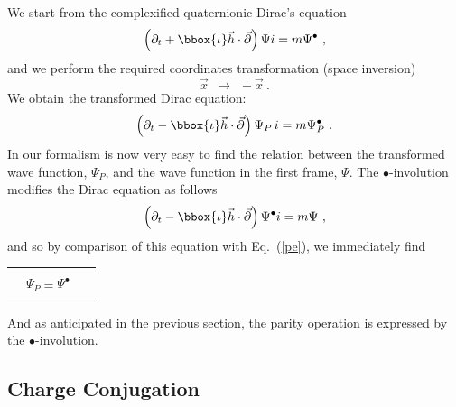 We start from the complexified quaternionic Dirac's equation
\[ \left( \partial_t + \bbox{\iota} \vec{h} \cdot \vec{\partial} \right) 
\Psi i 
= m \Psi^{\bullet}~, \] 
and we perform the required coordinates transformation (space inversion)
\[ \vec{x} ~~\rightarrow ~~ -\vec{x}~.\]
We obtain the transformed Dirac equation:
\begin{equation}
\label{pe}
\left( \partial_t - \bbox{\iota} \vec{h} \cdot \vec{\partial}
\right) \Psi_P \, i = 
m \Psi_P^{\bullet}~. 
\end{equation} 
In our formalism is now very easy to find the relation between the transformed 
wave function, $\Psi_P$, and the wave function in the first frame, $\Psi$.
The $\bullet$-involution modifies the Dirac equation as follows 
\[ \left( \partial_t - \bbox{\iota} \vec{h} \cdot \vec{\partial}
\right) \Psi^{\bullet} i = 
m \Psi~, \] 
and so by comparison of 
this equation with Eq.~(\ref{pe}), we immediately find
\begin{center}
\begin{tabular}{|c|} \hline \\ 
~~$\Psi_P \equiv \Psi^{\bullet}$~~~\\  \\
\hline
\end{tabular}
\end{center}
And as anticipated in the previous section, the parity operation is expressed
by the $\bullet$-involution.

\subsection{Charge Conjugation}
\label{s52}

